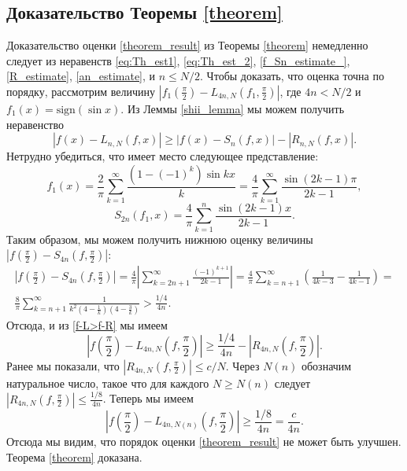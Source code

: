 \subsection{Доказательство Теоремы \ref{theorem}}
Доказательство оценки \eqref{theorem_result} из Теоремы \ref{theorem} немедленно следует из неравенств \eqref{eq:Th_est1}, \eqref{eq:Th_est_2}, \eqref{f_Sn_estimate_}, \eqref{R_estimate}, \eqref{an_estimate},
и $n \leq N/2$.
Чтобы доказать, что оценка точна по порядку, рассмотрим величину  $\left|f_1(\frac{\pi}{2}) - L_{4n,N}(f_1,\frac{\pi}{2})\right|$, где $4n < N/2$ и $f_1(x) = \mbox{sign} (\sin x)$.
Из Леммы \ref{shii_lemma} мы можем получить неравенство
\begin{equation*}
\left|f(x) - L_{n,N}(f,x)\right| \geq \left|f(x) - S_n(f,x)\right| -  \left|R_{n,N}(f,x)\right|.
\end{equation*}
Нетрудно убедиться, что имеет место следующее представление:
\begin{equation} \label{f-L>f-R}
f_1(x) = \frac{2}{\pi} \sum_{k=1}^{\infty} \frac{(1-(-1)^k) \sin kx}{k} = \frac{4}{\pi} \sum_{k=1}^{\infty} \frac{\sin (2k-1)\pi}{2k-1},
\end{equation}
\begin{equation*}
S_{2n}(f_1,x) = \frac{4}{\pi} \sum_{k=1}^{n} \frac{\sin(2k-1)x}{2k-1}.
\end{equation*}
Таким образом, мы можем получить нижнюю оценку величины $\left|f\left(\frac{\pi}{2}\right) - S_{4n}\left(f,\frac{\pi}{2}\right)\right|$:
\begin{multline*}
\left|f\left(\frac{\pi}{2}\right) - S_{4n}\left(f,\frac{\pi}{2}\right)\right| =
\frac{4}{\pi} \left|\sum_{k=2n+1}^{\infty} \frac{(-1)^{k+1}}{2k-1}\right| =
\frac{4}{\pi} \sum_{k=n+1}^{\infty} \left(\frac{1}{4k-3} - \frac{1}{4k-1}\right)= \\
\frac{8}{\pi} \sum_{k=n+1}^{\infty} \frac{1}{k^2 \left(4-\frac{1}{k}\right) \left(4- \frac{3}{k}\right)} > \frac{1/4}{4n}.
\end{multline*}
Отсюда, и из \eqref{f-L>f-R} мы имеем
\begin{equation*}
\left|f\left(\frac{\pi}{2}\right) - L_{4n,N}\left(f,\frac{\pi}{2}\right)\right| \geq \frac{1/4}{4n} - \left|R_{4n,N}\left(f,\frac{\pi}{2}\right)\right|.
\end{equation*}
Ранее мы показали, что $\left|R_{4n,N}\left(f,\frac{\pi}{2}\right)\right| \leq c/N $.
Через $N(n)$ обозначим натуральное число, такое что для каждого $N \geq N(n)$ следует
$\left|R_{4n,N}\left(f,\frac{\pi}{2}\right)\right| \leq \frac{1/8}{4n}$. Теперь мы имеем
\begin{equation*}
\left|f\left(\frac{\pi}{2}\right) - L_{4n,N(n)}\left(f,\frac{\pi}{2}\right)\right| \geq \frac{1/8}{4n} = \frac{c}{4n}.
\end{equation*}
Отсюда мы видим, что порядок оценки \eqref{theorem_result} не может быть улучшен. Теорема \ref{theorem} доказана.

